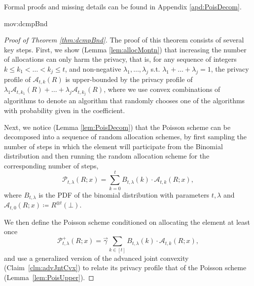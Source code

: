 \documentclass{article}
\newcommand{\NeurIPS}[1]{#1}
\newcommand{\NeurIPS}[1]{}
\theoremstyle{plain}
\theoremstyle{definition}
\newcommand{\rand}{R}
\newcommand{\PoisFunc}[3]{\mathcal{P}_{#1}\left(#2; #3\right)}
\newcommand{\alloc}[2]{\mathcal{A}_{#1}\left(#2\right)}
\newcommand{\allocFunc}[3]{\mathcal{A}_{#1}\left(#2; #3\right)}
\newcommand{\rem}[1]{\vec{#1}}
\begin{document}
Formal proofs and missing details can be found in Appendix \ref{apd:PoisDecom}.
\begin{movable}{mov:dcmpBnd}{}
\begin{proof}\NeurIPS{[Proof of Theorem \ref{thm:dcmpBnd}]}
    The proof of this theorem consists of several key steps. First, we show (Lemma \ref{lem:allocMontn}) that increasing the number of allocations can only harm the privacy, that is, for any sequence of integers $k \le k_{1} < \ldots < k_{j} \le t$, and non-negative $\lambda_{1}, \ldots, \lambda_{j}$ s.t. $\lambda_{1} + \ldots + \lambda_{j} = 1$, the privacy profile of $\alloc{t, k}{\rand}$ is upper-bounded by the privacy profile of $\lambda_{1} \alloc{t, k_{1}}{\rand} + \ldots + \lambda_{j} \alloc{t, k_{j}}{\rand}$, where we use convex combinations of algorithms to denote an algorithm that randomly chooses one of the algorithms with probability given in the coefficient.

    Next, we notice (Lemma \ref{lem:PoisDecom}) that the Poisson scheme can be decomposed into a sequence of random allocation schemes, by first sampling the number of steps in which the element will participate from the Binomial distribution and then running the random allocation scheme for the corresponding number of steps,
        \[
	        \PoisFunc{t, \lambda}{\rand}{x} = \sum_{k = 0}^{t} B_{t, \lambda}(k) \cdot \allocFunc{t, k}{\rand}{x}, 
    	\]
    	where $B_{t, \lambda}$ is the PDF of the binomial distribution with parameters $t, \lambda$ and $\allocFunc{t, 0}{\rand}{x} \coloneqq \rand^{\otimes t}(\bot)$.

	    
	We then define the Poisson scheme conditioned on allocating the element at least once
	    \[
    	    \mathcal{P}_{t, \lambda}^{+}(\rand; x) = \rem{\gamma} \sum_{k \in [t]} B_{t, \lambda}(k) \cdot \allocFunc{t, k}{\rand}{x},
	    \]
		and use a generalized version of the advanced joint convexity (Claim~\ref{clm:advJntCvx}) to relate its privacy profile that of the Poisson scheme (Lemma~\ref{lem:PoisUpper}). 
		

\end{proof}
\end{movable}
\end{document}
